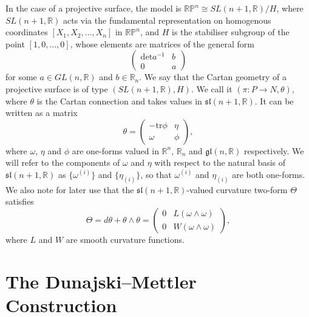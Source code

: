 In the case of a projective surface, the model is $\mathbb{RP}^{n}\cong SL(n+1,\mathbb{R})/H$,
where $SL(n+1,\mathbb{R})$ acts via the fundamental representation
on homogenous coordinates $[X_1,X_2,\dots,X_n]$ in $\mathbb{RP}^{n}$, and $H$
is the stabiliser subgroup of the point $[1,0,\dots,0]$, whose elements
are matrices of the general form
\[
\begin{pmatrix}\mathrm{det}a^{-1} & b\\
0 & a
\end{pmatrix}
\]
for some $a\in GL(n,\mathbb{R})$ and $b\in\mathbb{R}_{n}$. We say
that the Cartan geometry of a projective surface is of type $(SL(n+1,\mathbb{R}),H)$.
We call it $(\pi:P\rightarrow N,\theta)$, where $\theta$ is the
Cartan connection and takes values in $\mathfrak{sl}(n+1,\mathbb{R})$.
It can be written as a matrix
\[
\theta=\begin{pmatrix}-\mathrm{tr}\phi & \eta\\
\omega & \phi
\end{pmatrix},
\]
where $\omega$, $\eta$ and $\phi$ are one-forms valued in $\mathbb{R}^{n}$,
$\mathbb{R}_{n}$ and $\mathfrak{gl}(n,\mathbb{R})$ respectively.
We will refer to the components of $\omega$ and $\eta$ with respect
to the natural basis of $\mathfrak{sl}(n+1,\mathbb{R})$ as $\{\omega^{(i)}\}$
and $\{\eta_{(i)}\}$, so that $\omega^{(i)}$ and $\eta_{(i)}$ are
both one-forms. We also note for later use that the $\mathfrak{sl}(n+1,\mathbb{R})$-valued
curvature two-form $\Theta$ satisfies
\[
\Theta=d\theta+\theta\wedge\theta=\begin{pmatrix}0 & L(\omega\wedge\omega)\\
0 & W(\omega\wedge\omega)
\end{pmatrix},
\]
where $L$ and $W$ are smooth curvature functions.


\section{The Dunajski--Mettler Construction \cite{DM}}

